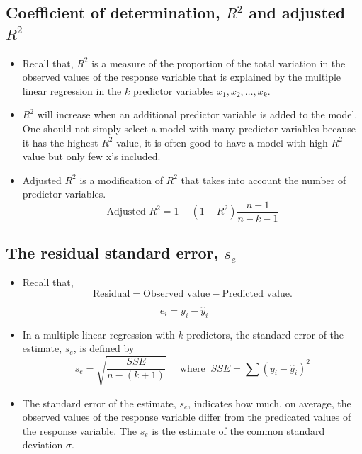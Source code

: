 \documentclass[
]{article}
\providecommand{\tightlist}{%
  \setlength{\itemsep}{0pt}\setlength{\parskip}{0pt}}
\begin{document}
\hypertarget{coefficient-of-determination-r2-and-adjusted-r2}{%
\subsection{\texorpdfstring{Coefficient of determination, \(R^2\) and
adjusted
\(R^2\)}{Coefficient of determination, R\^{}2 and adjusted R\^{}2}}\label{coefficient-of-determination-r2-and-adjusted-r2}}

\begin{itemize}
\item
  Recall that, \(R^2\) is a measure of the proportion of the total
  variation in the observed values of the response variable that is
  explained by the multiple linear regression in the \(k\) predictor
  variables \(x_1, x_2, \ldots, x_k\).
\item
  \(R^2\) will increase when an additional predictor variable is added
  to the model. One should not simply select a model with many predictor
  variables because it has the highest \(R^2\) value, it is often good
  to have a model with high \(R^2\) value but only few x's included.
\item
  Adjusted \(R^2\) is a modification of \(R^2\) that takes into account
  the number of predictor variables.
  \[\mbox{Adjusted-}R^2=1-(1-R^2)\frac{n-1}{n-k-1}\]
\end{itemize}

\hypertarget{the-residual-standard-error-s_e}{%
\subsection{\texorpdfstring{The residual standard error,
\(s_e\)}{The residual standard error, s\_e}}\label{the-residual-standard-error-s_e}}

\begin{itemize}
\tightlist
\item
  Recall that,
  \[\text{Residual} = \text{Observed value} - \text{Predicted value.}\]
\end{itemize}

\[e_i=y_i-\hat{y}_i\]

\begin{itemize}
\item
  In a multiple linear regression with \(k\) predictors, the standard
  error of the estimate, \(s_e\), is defined by
  \[s_e=\sqrt{\frac{SSE}{n-(k+1)}}\;\;\;\;\; \text{where}\;\;SSE=\sum (y_i-\hat{y}_i)^2\]
\item
  The standard error of the estimate, \(s_e\), indicates how much, on
  average, the observed values of the response variable differ from the
  predicated values of the response variable. The \(s_e\) is the
  estimate of the common standard deviation \(\sigma\).
\end{itemize}
\end{document}
